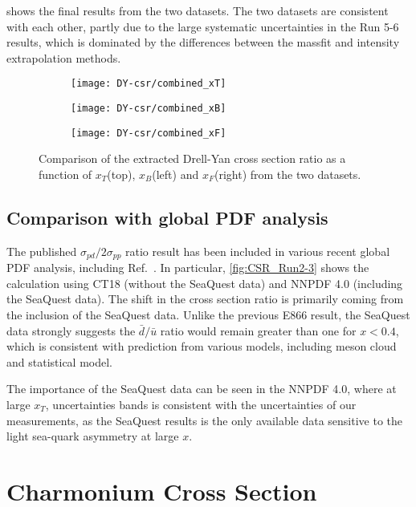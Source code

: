 \documentclass[../main.tex]{subfiles}
\begin{document}
 shows the final results from the two datasets. The two datasets
are consistent with each other, partly due to the large systematic uncertainties in the 
Run 5-6 results, which is dominated by the differences between the massfit and intensity
extrapolation methods.
\begin{figure}
	\centering
	\begin{subfigure}{0.6\linewidth}
		\texttt{[image: DY-csr/combined\_xT]}
	\end{subfigure}
	\begin{subfigure}{0.45\linewidth}
		\texttt{[image: DY-csr/combined\_xB]}
	\end{subfigure}
	\begin{subfigure}{0.45\linewidth}
		\texttt{[image: DY-csr/combined\_xF]}
	\end{subfigure}
	\caption{Comparison of the extracted Drell-Yan cross section ratio as a function of $x_T$(top),  $x_B$(left)
		and $x_F$(right) from the two datasets.}
	\label{fig:CSR_combined}
\end{figure}


\subsection{Comparison with global PDF analysis}
The published $\sigma_{pd}/2\sigma_{pp}$ ratio result has been included in various recent global
PDF analysis, including Ref.~\cite{cocuzza2021,guzzi2022,accardi2023,alekhin2023}.
In particular, \cref{fig:CSR_Run2-3} shows the calculation using CT18 (without the SeaQuest data)
and NNPDF 4.0 (including the SeaQuest data). The shift in the cross section ratio is primarily
coming from the inclusion of the SeaQuest data. Unlike the previous E866 result, the SeaQuest data
strongly suggests the $\bar{d}/\bar{u}$ ratio would remain greater than one for $x<0.4$, which is
consistent with prediction from various models, including meson cloud and statistical model.

The importance of the SeaQuest data can be seen in the NNPDF 4.0, where at large $x_T$,
uncertainties bands is consistent with the uncertainties of our measurements, as the SeaQuest
results is the only available data sensitive to the light sea-quark asymmetry at large $x$.
\FloatBarrier

\section{Charmonium Cross Section}
\end{document}
